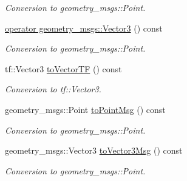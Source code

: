 \begin{DoxyCompactItemize}
\begin{DoxyCompactList}\small\item\em Conversion to geometry\+\_\+msgs\+::\+Point. \end{DoxyCompactList}\item 
\hyperlink{classow__core_1_1Vector3Base_a37dffd5d587429fac646d774518dc652}{operator geometry\+\_\+msgs\+::\+Vector3} () const \hypertarget{classow__core_1_1Vector3Base_a37dffd5d587429fac646d774518dc652}{}\label{classow__core_1_1Vector3Base_a37dffd5d587429fac646d774518dc652}

\begin{DoxyCompactList}\small\item\em Conversion to geometry\+\_\+msgs\+::\+Point. \end{DoxyCompactList}\item 
tf\+::\+Vector3 \hyperlink{classow__core_1_1Vector3Base_a3c471227cd7c77273bdde38b7ce647ef}{to\+Vector\+TF} () const \hypertarget{classow__core_1_1Vector3Base_a3c471227cd7c77273bdde38b7ce647ef}{}\label{classow__core_1_1Vector3Base_a3c471227cd7c77273bdde38b7ce647ef}

\begin{DoxyCompactList}\small\item\em Conversion to tf\+::\+Vector3. \end{DoxyCompactList}\item 
geometry\+\_\+msgs\+::\+Point \hyperlink{classow__core_1_1Vector3Base_a9cbfb3bff2119b45018b3bbadc56628a}{to\+Point\+Msg} () const \hypertarget{classow__core_1_1Vector3Base_a9cbfb3bff2119b45018b3bbadc56628a}{}\label{classow__core_1_1Vector3Base_a9cbfb3bff2119b45018b3bbadc56628a}

\begin{DoxyCompactList}\small\item\em Conversion to geometry\+\_\+msgs\+::\+Point. \end{DoxyCompactList}\item 
geometry\+\_\+msgs\+::\+Vector3 \hyperlink{classow__core_1_1Vector3Base_a963c10f03946c82728127a699d925e73}{to\+Vector3\+Msg} () const \hypertarget{classow__core_1_1Vector3Base_a963c10f03946c82728127a699d925e73}{}\label{classow__core_1_1Vector3Base_a963c10f03946c82728127a699d925e73}

\begin{DoxyCompactList}\small\item\em Conversion to geometry\+\_\+msgs\+::\+Point. \end{DoxyCompactList}\end{DoxyCompactItemize}


